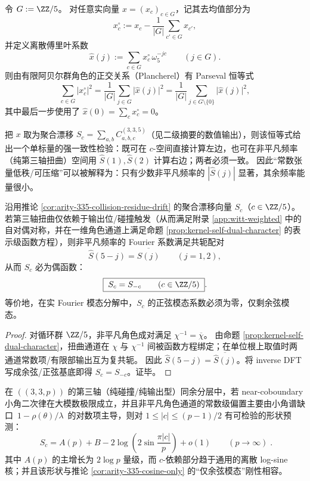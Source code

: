 \begin{remark}\label{rem:arity-335-parseval-bias}
令 \(G:=\ZZ/5\)。
对任意实向量 \(x=(x_c)_{c\in G}\)，记其去均值部分为
\[
x_c^\circ:=x_c-\frac{1}{|G|}\sum_{c'\in G}x_{c'},
\]
并定义离散傅里叶系数
\[
\widehat x(j):=\sum_{c\in G}x_c^\circ\,\omega_5^{-jc}\qquad(j\in G).
\]
则由有限阿贝尔群角色的正交关系（Plancherel）有 Parseval 恒等式
\[
\sum_{c\in G}\bigl|x_c^\circ\bigr|^2
=\frac{1}{|G|}\sum_{j\in G}\bigl|\widehat x(j)\bigr|^2
=\frac{1}{|G|}\sum_{j\in G\setminus\{0\}}\bigl|\widehat x(j)\bigr|^2,
\]
其中最后一步使用了 \(\widehat x(0)=\sum_c x_c^\circ=0\)。
\par
把 \(x\) 取为聚合漂移 \(S_c=\sum_{a,b}C^{(3,3,5)}_{a,b,c}\)（见二级摘要的数值输出），则该恒等式给出一个单标量的强一致性检验：既可在 \(c\)-空间直接计算左边，也可在非平凡频率（纯第三轴扭曲）空间用 \(\widehat S(1),\widehat S(2)\) 计算右边；两者必须一致。
因此“常数张量低秩/可压缩”可以被解释为：只有少数非平凡频率的 \(|\widehat S(j)|\) 显著，其余频率能量很小。
\end{remark}

\begin{corollary}\label{cor:arity-335-cosine-only}
沿用推论 \ref{cor:arity-335-collision-residue-drift} 的聚合漂移向量 \(S_c\)（\(c\in\ZZ/5\)）。
若第三轴扭曲仅依赖于输出位/碰撞触发（从而满足附录 \ref{app:witt-weighted} 中的自对偶对称，并在一维角色通道上满足命题 \ref{prop:kernel-self-dual-character} 的表示级函数方程），则非平凡频率的 Fourier 系数满足共轭配对
\[
\widehat S(5-j)=\overline{\widehat S(j)}\qquad(j=1,2),
\]
从而 \(S_c\) 必为偶函数：
\[
\boxed{\;
S_c=S_{-c}\qquad(c\in\ZZ/5)\; }.
\]
等价地，在实 Fourier 模态分解中，\(S_c\) 的正弦模态系数必须为零，仅剩余弦模态。
\end{corollary}
\begin{proof}
对循环群 \(\ZZ/5\)，非平凡角色成对满足 \(\chi^{-1}=\overline{\chi}\)。
由命题 \ref{prop:kernel-self-dual-character}，扭曲通道在 \(\chi\) 与 \(\chi^{-1}\) 间被函数方程绑定；在单位根上取值时两通道常数项/有限部输出互为复共轭。
因此 \(\widehat S(5-j)=\overline{\widehat S(j)}\)。将 inverse DFT 写成余弦/正弦基底即得 \(S_c=S_{-c}\)。证毕。
\end{proof}

\begin{conjecture}\label{conj:arity-335-log-sine-shape}
在 \(((3,3,p))\) 的第三轴（纯碰撞/纯输出型）同余分层中，若 near-coboundary 小角二次律在大模数极限成立，并且非平凡角色通道的常数级偏置主要由小角谱缺口 \(\,1-\rho(\theta)/\lambda\,\) 的对数项主导，则对 \(1\le |c|\le (p-1)/2\) 有可检验的形状预测：
\[
\boxed{\;
S_c=A(p)+B-2\log\!\left(2\sin\frac{\pi |c|}{p}\right)+o(1)\qquad(p\to\infty)\; }.
\]
其中 \(A(p)\) 的主增长为 \(2\log p\) 量级，而 \(c\)-依赖部分趋于通用的离散 log-sine 核；并且该形状与推论 \ref{cor:arity-335-cosine-only} 的“仅余弦模态”刚性相容。
\end{conjecture}

